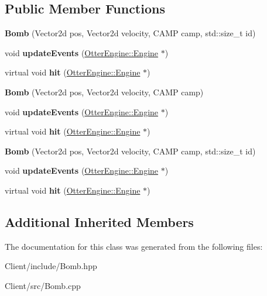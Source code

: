 \subsection*{Public Member Functions}
\begin{DoxyCompactItemize}
\item 
{\bfseries Bomb} (Vector2d pos, Vector2d velocity, C\+A\+MP camp, std\+::size\+\_\+t id)\hypertarget{class_bomb_a199d1929413f9256cadc36012099568c}{}\label{class_bomb_a199d1929413f9256cadc36012099568c}

\item 
void {\bfseries update\+Events} (\hyperlink{class_otter_engine_1_1_engine}{Otter\+Engine\+::\+Engine} $\ast$)\hypertarget{class_bomb_a8eb95a7f5d459b7b667edb12f0656f9e}{}\label{class_bomb_a8eb95a7f5d459b7b667edb12f0656f9e}

\item 
virtual void {\bfseries hit} (\hyperlink{class_otter_engine_1_1_engine}{Otter\+Engine\+::\+Engine} $\ast$)\hypertarget{class_bomb_a10ff37bd4d744391ad5f873509059e92}{}\label{class_bomb_a10ff37bd4d744391ad5f873509059e92}

\item 
{\bfseries Bomb} (Vector2d pos, Vector2d velocity, C\+A\+MP camp)\hypertarget{class_bomb_a626bbe5f27a4bf075cac455795e51a32}{}\label{class_bomb_a626bbe5f27a4bf075cac455795e51a32}

\item 
void {\bfseries update\+Events} (\hyperlink{class_otter_engine_1_1_engine}{Otter\+Engine\+::\+Engine} $\ast$)\hypertarget{class_bomb_a8eb95a7f5d459b7b667edb12f0656f9e}{}\label{class_bomb_a8eb95a7f5d459b7b667edb12f0656f9e}

\item 
virtual void {\bfseries hit} (\hyperlink{class_otter_engine_1_1_engine}{Otter\+Engine\+::\+Engine} $\ast$)\hypertarget{class_bomb_a8bdf487ce365664958bfda34af0a4b9f}{}\label{class_bomb_a8bdf487ce365664958bfda34af0a4b9f}

\item 
{\bfseries Bomb} (Vector2d pos, Vector2d velocity, C\+A\+MP camp, std\+::size\+\_\+t id)\hypertarget{class_bomb_a199d1929413f9256cadc36012099568c}{}\label{class_bomb_a199d1929413f9256cadc36012099568c}

\item 
void {\bfseries update\+Events} (\hyperlink{class_otter_engine_1_1_engine}{Otter\+Engine\+::\+Engine} $\ast$)\hypertarget{class_bomb_a8eb95a7f5d459b7b667edb12f0656f9e}{}\label{class_bomb_a8eb95a7f5d459b7b667edb12f0656f9e}

\item 
virtual void {\bfseries hit} (\hyperlink{class_otter_engine_1_1_engine}{Otter\+Engine\+::\+Engine} $\ast$)\hypertarget{class_bomb_a8bdf487ce365664958bfda34af0a4b9f}{}\label{class_bomb_a8bdf487ce365664958bfda34af0a4b9f}

\end{DoxyCompactItemize}
\subsection*{Additional Inherited Members}


The documentation for this class was generated from the following files\+:\begin{DoxyCompactItemize}
\item 
Client/include/Bomb.\+hpp\item 
Client/src/Bomb.\+cpp\end{DoxyCompactItemize}
